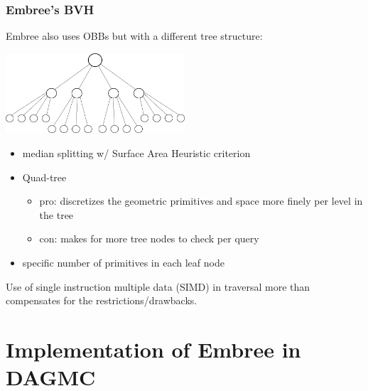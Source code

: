 \documentclass[12pt]{beamer}
\begin{document}
\begin{frame}

\frametitle{Embree's BVH}

Embree also uses OBBs but with a different tree structure:

\begin{center}
\includegraphics[width=0.5\textwidth]{quad_tree.png}
\end{center}

\begin{itemize}
\item median splitting w/ Surface Area Heuristic \cite{sah} criterion 
\item Quad-tree
  \begin{itemize}
  \item pro: discretizes the geometric primitives and space more finely per level in the tree
  \item con: makes for more tree nodes to check per query
  \end{itemize}
\item specific number of primitives in each leaf node
\end{itemize}
Use of single instruction multiple data (SIMD) in traversal  more than compensates for the restrictions/drawbacks.
\end{frame}


\section{Implementation of Embree in DAGMC} %
\end{document}
